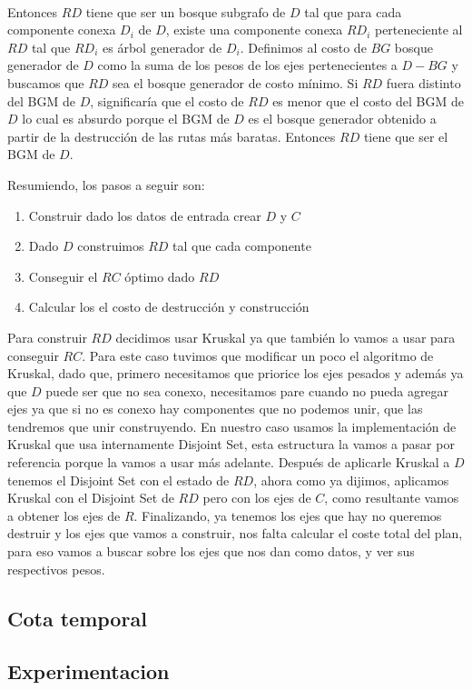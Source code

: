 \\
\par
Entonces $RD$ tiene que ser un bosque subgrafo de $D$ tal que para cada componente conexa $D_i$ de $D$, existe una componente conexa $RD_i$ perteneciente al $RD$ tal que $RD_i$ es árbol generador de $D_i$. Definimos al costo de $BG$ bosque generador de $D$  como la suma de los pesos de los ejes pertenecientes a $D - BG$ y buscamos que $RD$ sea el bosque generador de costo mínimo. Si $RD$ fuera distinto del BGM de $D$, significaría que el costo de $RD$ es menor que el costo del BGM de $D$ lo cual es absurdo porque el BGM de $D$ es el bosque generador obtenido a partir de la destrucción de las rutas más baratas. Entonces $RD$ tiene que ser el BGM de $D$.
\\
\par
Resumiendo, los pasos a seguir son:
\begin{enumerate}
\item Construir dado los datos de entrada crear $D$ y $C$
\item Dado $D$ construimos $RD$ tal que cada componente
\item Conseguir el $RC$ óptimo dado $RD$
\item Calcular los el costo de destrucción y construcción
\end{enumerate}
Para construir $RD$ decidimos usar Kruskal ya que también lo vamos a usar para conseguir $RC$. Para este caso tuvimos que modificar un poco el algoritmo de Kruskal, dado que, primero necesitamos que priorice los ejes pesados y además ya que $D$ puede ser que no sea conexo, necesitamos pare cuando no pueda agregar ejes ya que si no es conexo hay componentes que no podemos unir, que las tendremos que unir construyendo. En nuestro caso usamos la implementación de Kruskal que usa internamente Disjoint Set, esta estructura la vamos a pasar por referencia porque la vamos a usar más adelante.
Después de aplicarle Kruskal a $D$ tenemos el Disjoint Set con el estado de $RD$, ahora como ya dijimos, aplicamos Kruskal con el Disjoint Set de $RD$ pero con los ejes de $C$, como resultante vamos a obtener los ejes de $R$. Finalizando, ya tenemos los ejes que hay no queremos destruir y los ejes que vamos a construir, nos falta calcular el coste total del plan, para eso vamos a buscar sobre los ejes que nos dan como datos, y ver sus respectivos pesos.


\subsection{Cota temporal}

\subsection{Experimentacion}

\pagebreak